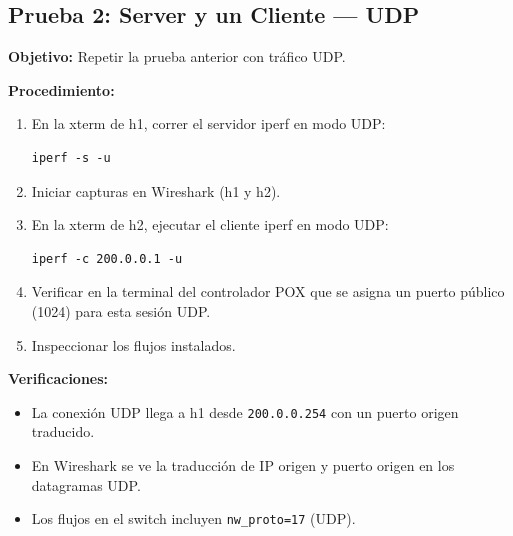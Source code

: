 \documentclass[11pt, a4paper]{article}
\begin{document}


\subsection{Prueba 2: Server y un Cliente --- UDP}

\textbf{Objetivo:} Repetir la prueba anterior con tráfico UDP.

\textbf{Procedimiento:}
\begin{enumerate}
    \item En la xterm de h1, correr el servidor iperf en modo UDP:
\begin{verbatim}
iperf -s -u
\end{verbatim}
    \item Iniciar capturas en Wireshark (h1 y h2).
    \item En la xterm de h2, ejecutar el cliente iperf en modo UDP:
\begin{verbatim}
iperf -c 200.0.0.1 -u
\end{verbatim}
    \item Verificar en la terminal del controlador POX que se asigna un puerto público (1024) para esta sesión UDP.
    \item Inspeccionar los flujos instalados.
\end{enumerate}

\textbf{Verificaciones:}
\begin{itemize}
    \item La conexión UDP llega a h1 desde \texttt{200.0.0.254} con un puerto origen traducido.
    \item En Wireshark se ve la traducción de IP origen y puerto origen en los datagramas UDP.
    \item Los flujos en el switch incluyen \texttt{nw\_proto=17} (UDP).
\end{itemize}
\end{document}
